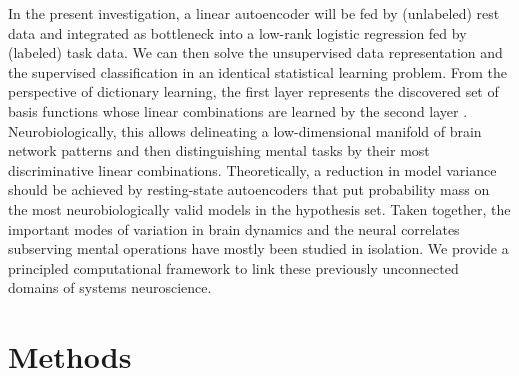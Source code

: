 \documentclass{article} %
\begin{document}
In the present investigation,
a linear autoencoder will be fed by (unlabeled) rest data and
integrated as bottleneck
into a low-rank logistic regression fed by (labeled) task data.
We can then solve the unsupervised data representation and the
supervised classification in an identical statistical learning
problem.
%
From the perspective of dictionary learning, the first layer represents
the discovered set of basis functions
whose linear combinations are learned
by the second layer \cite{olshausen96}.
%
Neurobiologically, this allows 
delineating a low-dimensional manifold of brain network patterns and then 
distinguishing mental tasks
by their most discriminative linear combinations.
%
Theoretically, a reduction in model variance should be achieved by
resting-state autoencoders that
put probability mass on the most neurobiologically
valid models in the hypothesis set.
%
Taken together,
the important modes of variation in brain dynamics and
the neural correlates subserving mental operations
have mostly been studied in isolation.
We provide a principled computational framework to link these previously
unconnected domains of systems neuroscience.

\section{Methods}
%
\end{document}
